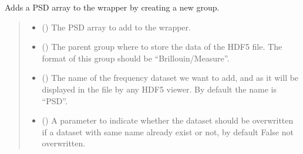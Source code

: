 \documentclass[letterpaper,10pt,english]{sphinxmanual}
\begin{document}
\begin{fulllineitems}

\begin{fulllineitems}
\label{\detokenize{source/HDF5_BLS:HDF5_BLS.wrapper.Wrapper.add_PSD}}
\pysigstartsignatures
\pysiglinewithargsret
{}
{\sphinxparamcomma {}\sphinxparamcomma {}\sphinxparamcomma {}}
{}
\pysigstopsignatures
\sphinxAtStartPar
Adds a PSD array to the wrapper by creating a new group.
\begin{quote}\begin{description}
\begin{itemize}
\item {} 
\sphinxAtStartPar
{} () \textendash{} The PSD array to add to the wrapper.

\item {} 
\sphinxAtStartPar
{} (\sphinxstyleliteralemphasis{\sphinxupquote{, }}) \textendash{} The parent group where to store the data of the HDF5 file. The format of this group should be “Brillouin/Measure”.

\item {} 
\sphinxAtStartPar
{} (\sphinxstyleliteralemphasis{\sphinxupquote{, }}) \textendash{} The name of the frequency dataset we want to add, and as it will be displayed in the file by any HDF5 viewer. By default the name is “PSD”.

\item {} 
\sphinxAtStartPar
{} (\sphinxstyleliteralemphasis{\sphinxupquote{, }}) \textendash{} A parameter to indicate whether the dataset should be overwritten if a dataset with same name already exist or not, by default False \sphinxhyphen{} not overwritten.


\end{itemize}
\end{description}
\end{quote}
\end{fulllineitems}
\end{fulllineitems}
\end{document}
